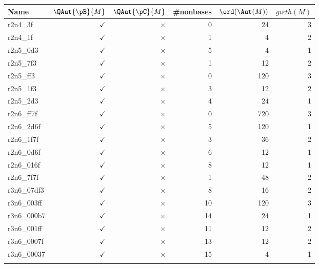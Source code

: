 \begin{center}
\small
\begin{longtable}{|l|r|r|r|r|r|}
 \hline  
  \textbf{Name} & \textbf{$\QAut{\pB}{M}$} & \textbf{$\QAut{\pC}{M}$} & \textbf{#nonbases} & \textbf{$\ord(\Aut(M))$} & \textbf{$girth(M)$} \\ \hline
  r2n4\_3f & $\checkmark$ & $\times$ & 0 & 24 & 3 \\ \hline
  r2n4\_1f & $\checkmark$ & $\times$ & 1 & 4 & 2 \\ \hline
  r2n5\_0d3 & $\checkmark$ & $\times$ & 5 & 4 & 1 \\ \hline
  r2n5\_7f3 & $\checkmark$ & $\times$ & 1 & 12 & 2 \\ \hline
  r2n5\_ff3 & $\checkmark$ & $\times$ & 0 & 120 & 3 \\ \hline
  r2n5\_1f3 & $\checkmark$ & $\times$ & 3 & 12 & 2 \\ \hline
  r2n5\_2d3 & $\checkmark$ & $\times$ & 4 & 24 & 1 \\ \hline
  r2n6\_ff7f & $\checkmark$ & $\times$ & 0 & 720 & 3 \\ \hline
  r2n6\_2d6f & $\checkmark$ & $\times$ & 5 & 120 & 1 \\ \hline
  r2n6\_1f7f & $\checkmark$ & $\times$ & 3 & 36 & 2 \\ \hline
  r2n6\_0d6f & $\checkmark$ & $\times$ & 6 & 12 & 1 \\ \hline
  r2n6\_016f & $\checkmark$ & $\times$ & 8 & 12 & 1 \\ \hline
  r2n6\_7f7f & $\checkmark$ & $\times$ & 1 & 48 & 2 \\ \hline
  r3n6\_07df3 & $\checkmark$ & $\times$ & 8 & 16 & 2 \\ \hline
  r3n6\_003ff & $\checkmark$ & $\times$ & 10 & 120 & 3 \\ \hline
  r3n6\_000b7 & $\checkmark$ & $\times$ & 14 & 24 & 1 \\ \hline
  r3n6\_001ff & $\checkmark$ & $\times$ & 11 & 12 & 2 \\ \hline
  r3n6\_0007f & $\checkmark$ & $\times$ & 13 & 12 & 2 \\ \hline
  r3n6\_00037 & $\checkmark$ & $\times$ & 15 & 4 & 1 \\ \hline
\label{Tab:computational-results-4}
\end{longtable}

\end{center}


